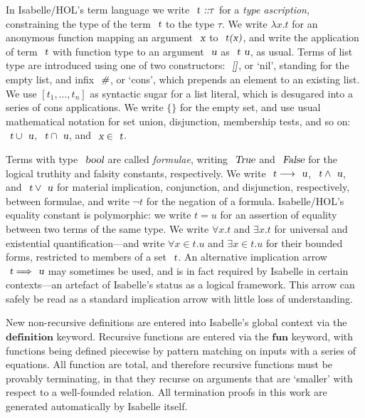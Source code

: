 \documentclass[acmlarge,review,anonymous]{acmart}\settopmatter{printfolios=true}
\begin{document}
In Isabelle/HOL's term language we write $\isa{t} \isa{::} \tau$ for a \emph{type ascription}, constraining the type of the term $\isa{t}$ to the type $\tau$.
We write $\lambda{x}. t$ for an anonymous function mapping an argument $\isa{x}$ to $\isa{t(x)}$, and write the application of term $\isa{t}$ with function type to an argument $\isa{u}$ as $\isa{t\ u}$, as usual.
Terms of list type are introduced using one of two constructors: $\isa{[]}$, or `nil', standing for the empty list, and infix $\isa{\#}$, or `cons', which prepends an element to an existing list.
We use $[t_1, \ldots, t_n]$ as syntactic sugar for a list literal, which is desugared into a series of cons applications.
We write $\{\}$ for the empty set, and use usual mathematical notation for set union, disjunction, membership tests, and so on: $\isa{t} \cup \isa{u}$, $\isa{t} \cap \isa{u}$, and $\isa{x} \in \isa{t}$.

Terms with type $\isa{bool}$ are called \emph{formulae}, writing $\isa{True}$ and $\isa{False}$ for the logical truthity and falsity constants, respectively.
We write $\isa{t} \longrightarrow \isa{u}$, $\isa{t} \wedge \isa{u}$, and $\isa{t} \vee \isa{u}$ for material implication, conjunction, and disjunction, respectively, between formulae, and write $\neg t$ for the negation of a formula.
Isabelle/HOL's equality constant is polymorphic: we write $t = u$ for an assertion of equality between two terms of the same type.
We write $\forall{x}.t$ and $\exists{x}.t$ for universal and existential quantification---and write $\forall{x{\in}t}.u$ and $\exists{x{\in}t}.u$ for their bounded forms, restricted to members of a set $\isa{t}$.
An alternative implication arrow $\isa{t} \Longrightarrow \isa{u}$ may sometimes be used, and is in fact required by Isabelle in certain contexts---an artefact of Isabelle's status as a logical framework.
This arrow can safely be read as a standard implication arrow with little loss of understanding.

New non-recursive definitions are entered into Isabelle's global context via the $\mathbf{definition}$ keyword.
Recursive functions are entered via the $\mathbf{fun}$ keyword, with functions being defined piecewise by pattern matching on inputs with a series of equations.
All function are total, and therefore recursive functions must be provably terminating, in that they recurse on arguments that are `smaller' with respect to a well-founded relation.
All termination proofs in this work are generated automatically by Isabelle itself.
\end{document}
